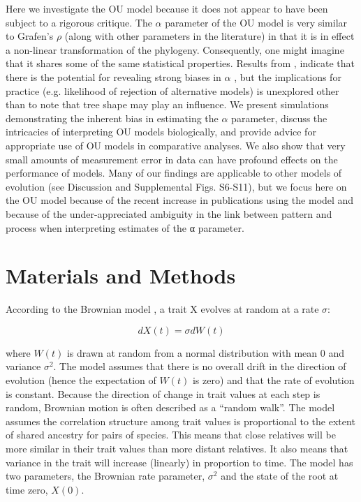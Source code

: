 \documentclass[a4paper,12pt]{article}
\begin{document}
Here we investigate the OU model because it does not appear to have been subject to a rigorous critique. The $\alpha$ parameter of the OU model is very similar to Grafen’s $\rho$ (along with other parameters in the literature) in that it is in effect a non-linear transformation of the phylogeny. Consequently, one might imagine that it shares some of the same statistical properties. Results from \citet{ho2013asymptotic}, indicate that there is the potential for revealing strong biases in $\alpha$ , but the implications for practice (e.g. likelihood of rejection of alternative models) is unexplored other than to note that tree shape may play an influence. We present simulations demonstrating the inherent bias in estimating the $\alpha$ parameter, discuss the intricacies of interpreting OU models biologically, and provide advice for appropriate use of OU models in comparative analyses. We also show that very small amounts of measurement error in data can have profound effects on the performance of models. Many of our findings are applicable to other models of evolution (see Discussion and Supplemental Figs. S6-S11), but we focus here on the OU model because of the recent increase in publications using the model and because of the under-appreciated ambiguity in the link between pattern and process when interpreting estimates of the α parameter. 

\section{Materials and Methods}
According to the Brownian model \cite{cavalli1967,felsenstein1973maximum}, a trait X evolves at random at a rate $\sigma$:

  \begin{equation}
    dX(t) = \sigma dW(t)
    \label{equation:BMrate} 
  \end{equation}

where $W(t)$ is drawn at random from a normal distribution with mean $0$ and variance $\sigma^2$. The model assumes that there is no overall drift in the direction of evolution (hence the expectation of $W(t)$ is zero) and that the rate of evolution is constant. Because the direction of change in trait values at each step is random, Brownian motion is often described as a ``random walk''. The model assumes the correlation structure among trait values is proportional to the extent of shared ancestry for pairs of species. This means that close relatives will be more similar in their trait values than more distant relatives. It also means that variance in the trait will increase (linearly) in proportion to time. The model has two parameters, the Brownian rate parameter, $\sigma^2$ and the state of the root at time zero, $X(0)$. 
\end{document}
